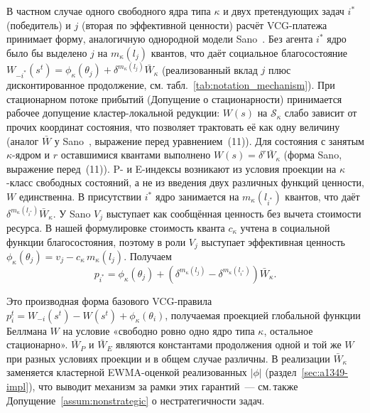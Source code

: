 \documentclass[14pt, oneside]{extbook}
\begin{document}
        В частном случае одного свободного ядра типа
        $\kappa$ и двух претендующих задач $i^*$ (победитель) и
        $j$ (вторая по эффективной ценности) расчёт VCG-платежа
        принимает форму, аналогичную однородной модели
        Sano~\cite{sano}. Без агента $i^*$ ядро было бы выделено
        $j$ на $m_\kappa(l_j)$ квантов, что даёт социальное
        благосостояние $W_{-i^*}(s^t) = \phi_\kappa(\theta_j) +
        \delta^{m_\kappa(l_j)}\bar W_\kappa$ (реализованный вклад
        $j$ плюс дисконтированное продолжение, см.
        табл.~\ref{tab:notation_mechanism}).
        При стационарном потоке
        прибытий (Допущение о стационарности) принимается
        рабочее допущение кластер-локальной редукции: $W(s)$
        на $\mathcal{S}_\kappa$ слабо зависит от прочих
        координат состояния, что позволяет трактовать её как
        одну величину (аналог $\bar W$ у Sano~\cite{sano},
        выражение перед уравнением~(11)). Для состояния с занятым $\kappa$-ядром
        и $r$ оставшимися квантами выполнено
        $W(s) = \delta^r \bar W_\kappa$
        (форма Sano, выражение перед~(11)). P- и E-индексы возникают из условия
        проекции на $\kappa$-класс свободных состояний, а не из
        введения двух различных функций ценности, $W$ единственна.
        В присутствии $i^*$ ядро занимается на $m_\kappa(l_{i^*})$
        квантов, что даёт $\delta^{m_\kappa(l_{i^*})}\bar W_\kappa$.
        У Sano $V_j$ выступает как сообщённая ценность без
        вычета стоимости ресурса. В нашей формулировке
        стоимость кванта $c_\kappa$ учтена в социальной
        функции благосостояния, поэтому в роли $V_j$ выступает
        эффективная ценность $\phi_\kappa(\theta_j) = v_j -
        c_\kappa\,m_\kappa(l_j)$. Получаем
        \begin{equation}\label{eq:single-unit-payment}
                p_{i^*} = \phi_\kappa(\theta_j) +
                (\delta^{m_\kappa(l_j)} - \delta^{m_\kappa(l_{i^*})})
                \bar{W}_\kappa.
        \end{equation}

        Это производная форма базового VCG-правила
        $p_i^t = W_{-i}(s^t) - W(s^t) + \phi_\kappa(\theta_i)$,
        получаемая проекцией глобальной функции Беллмана $W$
        на условие «свободно ровно одно ядро типа $\kappa$,
        остальное стационарно». $\bar W_P$ и $\bar W_E$
        являются константами продолжения одной и той
        же $W$ при разных условиях проекции и в общем случае
        различны. В реализации
        $\bar W_\kappa$ заменяется кластерной EWMA-оценкой
        реализованных $|\phi|$ (раздел~\ref{sec:a1349-impl}),
        что выводит механизм за рамки этих гарантий~---
        см.\,также Допущение~\ref{assum:nonstrategic}
        о нестратегичности задач.
\end{document}
